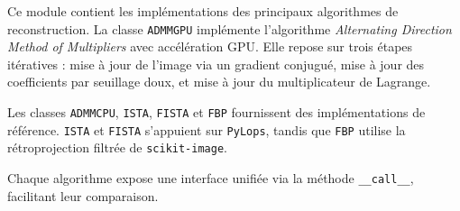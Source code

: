 
Ce module contient les implémentations des principaux algorithmes de reconstruction. La classe \texttt{ADMMGPU} implémente l'algorithme \emph{Alternating Direction Method of Multipliers} avec accélération GPU. Elle repose sur trois étapes itératives : mise à jour de l'image via un gradient conjugué, mise à jour des coefficients par seuillage doux, et mise à jour du multiplicateur de Lagrange.

Les classes \texttt{ADMMCPU}, \texttt{ISTA}, \texttt{FISTA} et \texttt{FBP} fournissent des implémentations de référence. \texttt{ISTA} et \texttt{FISTA} s'appuient sur \texttt{PyLops}, tandis que \texttt{FBP} utilise la rétroprojection filtrée de \texttt{scikit-image}.

Chaque algorithme expose une interface unifiée via la méthode \texttt{\_\_call\_\_}, facilitant leur comparaison.

